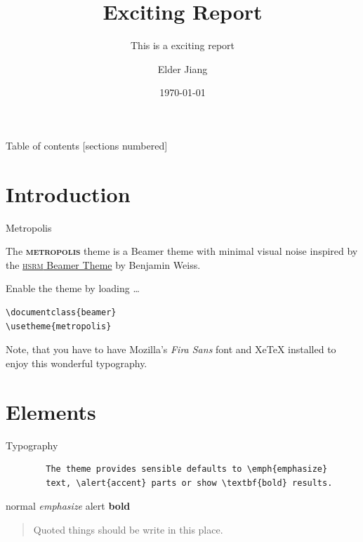 \documentclass[10pt]{beamer}
\title{Exciting Report}
\subtitle{This is a exciting report}
\date{\today}
\author{Elder Jiang}
\institute{Peking University}
\newcommand{\themename}{\textbf{\textsc{metropolis}}\xspace}
\begin{document}
\maketitle


\begin{frame}{Table of contents}
  [sections numbered]
  \tableofcontents[hideallsubsections]
\end{frame}



\section{Introduction}



\begin{frame}[fragile]{Metropolis}

  The \themename theme is a Beamer theme with minimal visual noise
  inspired by the \href{https://github.com/hsrmbeamertheme/hsrmbeamertheme}{\textsc{hsrm} Beamer
  Theme} by Benjamin Weiss.

  Enable the theme by loading \ldots

\begin{verbatim}    
\documentclass{beamer}
\usetheme{metropolis}
\end{verbatim}
  
  Note, that you have to have Mozilla's \emph{Fira Sans} font and XeTeX
  installed to enjoy this wonderful typography.
\end{frame}



\section{Elements}



\begin{frame}[fragile]{Typography}
	\begin{verbatim}
		The theme provides sensible defaults to \emph{emphasize} 
		text, \alert{accent} parts or show \textbf{bold} results.
	\end{verbatim}

	\begin{center}
		normal
		\emph{emphasize}
		\alert{alert}
		\textbf{bold}
	\end{center}
	
	\begin{quote}
    Quoted things should be write in this place.
  	\end{quote}

\end{frame}
\end{document}
